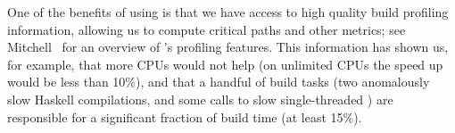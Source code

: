 One of the benefits of using \Shake is that we have access to high quality build
profiling information, allowing us to compute critical paths and other metrics;
see Mitchell~ for an overview of \Shake's
profiling features. This information has shown us, for example, that more CPUs would not help (on
unlimited CPUs the speed up would be less than 10\%), and that a handful of
build tasks (two anomalously slow Haskell compilations, and some calls to slow
single-threaded ) are responsible for a significant fraction of
build time (at least 15\%).




